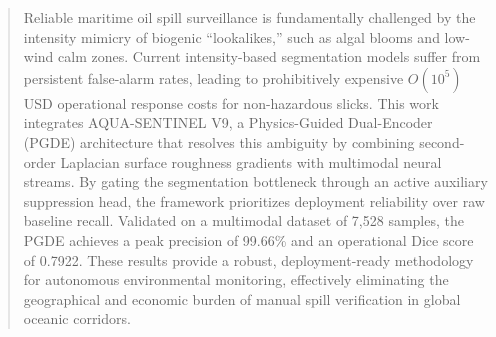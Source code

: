 \begin{abstract}
Reliable maritime oil spill surveillance is fundamentally challenged by the intensity mimicry of biogenic ``lookalikes,'' such as algal blooms and low-wind calm zones. Current intensity-based segmentation models suffer from persistent false-alarm rates, leading to prohibitively expensive $O(10^5)$ USD operational response costs for non-hazardous slicks. This work integrates AQUA-SENTINEL V9, a Physics-Guided Dual-Encoder (PGDE) architecture that resolves this ambiguity by combining second-order Laplacian surface roughness gradients with multimodal neural streams. By gating the segmentation bottleneck through an active auxiliary suppression head, the framework prioritizes deployment reliability over raw baseline recall. Validated on a multimodal dataset of 7,528 samples, the PGDE achieves a peak precision of 99.66\% and an operational Dice score of 0.7922. These results provide a robust, deployment-ready methodology for autonomous environmental monitoring, effectively eliminating the geographical and economic burden of manual spill verification in global oceanic corridors.
\end{abstract}
